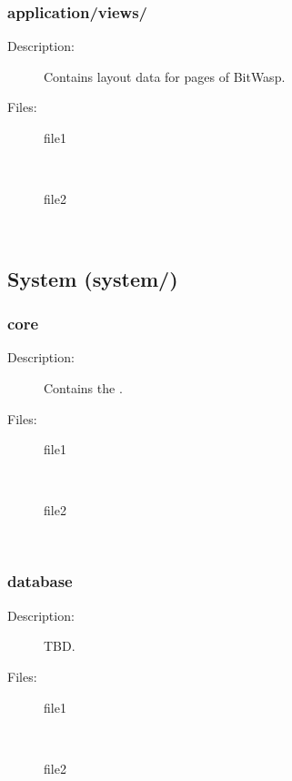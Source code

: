 \documentclass[11pt]{article} %
\begin{document}
\subsubsection{application/views/}
\begin{description}
\item[Description:] Contains layout data for pages of BitWasp.
\item[Files:] \textbf{ }
\begin{description}
\item[file1]  \textbf{ }\\
\item[file2]  \textbf{ }\\
\end{description} 
\end{description} 

\subsection{System (system/)}
\subsubsection{core}
\begin{description}
\item[Description:] Contains the .
\item[Files:] \textbf{ }
\begin{description}
\item[file1]  \textbf{ }\\
\item[file2]  \textbf{ }\\
\end{description} 
\end{description} 

\subsubsection{database}
\begin{description}
\item[Description:] TBD.
\item[Files:] \textbf{ }
\begin{description}
\item[file1]  \textbf{ }\\
\item[file2]  \textbf{ }\\
\end{description} 
\end{description} 
\end{document}
